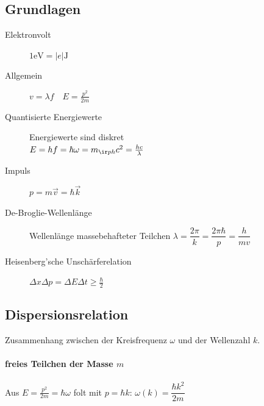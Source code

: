 \begin{sectionbox}
    \subsection{Grundlagen}
    \begin{description}
        \item[Elektronvolt] $1\si{\electronvolt} = |e|\si{\joule}$
        \item[Allgemein] $v=\lambda f \quad E=\frac{p^2}{2m}$
        \item[Quantisierte Energiewerte] Energiewerte sind diskret \\ $E=hf = \hbar\omega=m_{\ir ph}c^2=\frac{hc}{\lambda}$
        \item[Impuls] $p=m\vec v=\hbar \vec k$
        \item[De-Broglie-Wellenlänge] Wellenlänge massebehafteter Teilchen $\lambda = \dfrac{2\pi}{k}=\dfrac{2\pi\hbar}{p}=\dfrac{h}{mv}$
        \item[Heisenberg'sche Unschärferelation] $\Delta x \Delta p = \Delta E \Delta t \ge \frac{\hbar}{2}$
    \end{description}
\end{sectionbox}

\begin{sectionbox}
    \subsection{Dispersionsrelation}
    Zusammenhang zwischen der Kreisfrequenz $\omega$ und der Wellenzahl $k$.

    \paragraph{freies Teilchen der Masse $m$} Aus $E=\frac{p^2}{2m}=\hbar\omega$ folt mit $p=\hbar k$: $\omega(k) = \dfrac{\hbar k^2}{2m}$
\end{sectionbox}

